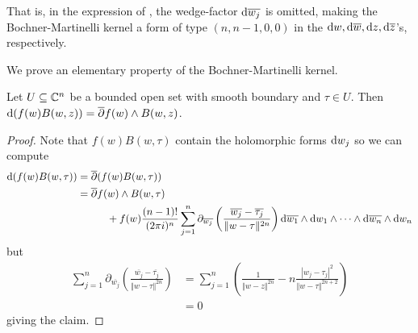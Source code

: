 \begin{remark}
    That is, in the expression of , the wedge-factor $\mathrm{d} \overline{w_{j}}$ is omitted, making the Bochner-Martinelli kernel a form of type $(n,n-1,0,0)$ in the $\mathrm{d} w, \mathrm{d}\overline{w}, \mathrm{d} z,\mathrm{d} \overline{z}$'s, respectively. 
\end{remark}
We prove an elementary property of the Bochner-Martinelli kernel. 
\begin{lemma}\label{lem: Bochner-Martinelli computation}
    Let $U\subseteq\mathbb{C}^{n}$ be a bounded open set with smooth boundary and $\tau\in U$. Then $\mathrm{d}(f(w)B(w,z))=\overline{\partial}f(w)\wedge B(w,z)$. 
\end{lemma}
\begin{proof}
    Note that $f(w)B(w,\tau)$ contain the holomorphic forms $\mathrm{d} w_{j}$ so we can compute 
    \begin{align*}
        \mathrm{d}(f(w)B(w,\tau)) &= \overline{\partial}(f(w)B(w,\tau)) \\
        &= \overline{\partial}f(w)\wedge B(w,\tau) \\
        &\hspace{1cm}+ f(w)\frac{(n-1)!}{(2\pi i)^{n}}\sum_{j=1}^{n}\partial_{\overline{w_{j}}}\left(\frac{\overline{w_{j}}-\overline{\tau_{j}}}{\Vert w-\tau\Vert^{2n}}\right)\mathrm{d}\overline{w_{1}}\wedge\mathrm{d} w_{1}\wedge\dots\wedge\mathrm{d}\overline{w_{n}}\wedge\mathrm{d} w_{n}
    \end{align*}
    but
    \begin{align*}
        \sum_{j=1}^{n}\partial_{\overline{w_{j}}}\left(\frac{\overline{w_{j}}-\overline{\tau_{j}}}{\Vert w-\tau\Vert^{2n}}\right) &= \sum_{j=1}^{n}\left(\frac{1}{\Vert w-z\Vert^{2n}}-n\frac{|w_{j}-\tau_{j}|^{2}}{\Vert w-\tau\Vert^{2n+2}}\right) \\
        &= 0
    \end{align*}
    giving the claim. 
\end{proof}